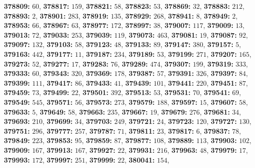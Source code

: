 \textsf{\bfseries 378809:} $60$, \textsf{\bfseries 378817:} $159$, \textsf{\bfseries 378821:} $58$, \textsf{\bfseries 378823:} $53$, \textsf{\bfseries 378869:} $32$, \textsf{\bfseries 378883:} $212$, \textsf{\bfseries 378893:} $2$, \textsf{\bfseries 378901:} $283$, \textsf{\bfseries 378919:} $135$, \textsf{\bfseries 378929:} $268$, \textsf{\bfseries 378941:} $8$, \textsf{\bfseries 378949:} $2$, \textsf{\bfseries 378953:} $66$, \textsf{\bfseries 378967:} $63$, \textsf{\bfseries 378977:} $172$, \textsf{\bfseries 378997:} $38$, \textsf{\bfseries 379007:} $117$, \textsf{\bfseries 379009:} $13$, \textsf{\bfseries 379013:} $72$, \textsf{\bfseries 379033:} $253$, \textsf{\bfseries 379039:} $119$, \textsf{\bfseries 379073:} $463$, \textsf{\bfseries 379081:} $19$, \textsf{\bfseries 379087:} $92$, \textsf{\bfseries 379097:} $132$, \textsf{\bfseries 379103:} $58$, \textsf{\bfseries 379123:} $48$, \textsf{\bfseries 379133:} $89$, \textsf{\bfseries 379147:} $380$, \textsf{\bfseries 379157:} $5$, \textsf{\bfseries 379163:} $442$, \textsf{\bfseries 379177:} $11$, \textsf{\bfseries 379187:} $234$, \textsf{\bfseries 379189:} $53$, \textsf{\bfseries 379199:} $271$, \textsf{\bfseries 379207:} $165$, \textsf{\bfseries 379273:} $52$, \textsf{\bfseries 379277:} $17$, \textsf{\bfseries 379283:} $76$, \textsf{\bfseries 379289:} $474$, \textsf{\bfseries 379307:} $199$, \textsf{\bfseries 379319:} $333$, \textsf{\bfseries 379333:} $60$, \textsf{\bfseries 379343:} $320$, \textsf{\bfseries 379369:} $178$, \textsf{\bfseries 379387:} $57$, \textsf{\bfseries 379391:} $326$, \textsf{\bfseries 379397:} $84$, \textsf{\bfseries 379399:} $111$, \textsf{\bfseries 379417:} $86$, \textsf{\bfseries 379433:} $41$, \textsf{\bfseries 379439:} $101$, \textsf{\bfseries 379441:} $220$, \textsf{\bfseries 379451:} $87$, \textsf{\bfseries 379459:} $73$, \textsf{\bfseries 379499:} $22$, \textsf{\bfseries 379501:} $392$, \textsf{\bfseries 379513:} $53$, \textsf{\bfseries 379531:} $70$, \textsf{\bfseries 379541:} $69$, \textsf{\bfseries 379549:} $545$, \textsf{\bfseries 379571:} $56$, \textsf{\bfseries 379573:} $273$, \textsf{\bfseries 379579:} $188$, \textsf{\bfseries 379597:} $15$, \textsf{\bfseries 379607:} $58$, \textsf{\bfseries 379633:} $5$, \textsf{\bfseries 379649:} $58$, \textsf{\bfseries 379663:} $235$, \textsf{\bfseries 379667:} $19$, \textsf{\bfseries 379679:} $276$, \textsf{\bfseries 379681:} $34$, \textsf{\bfseries 379693:} $210$, \textsf{\bfseries 379699:} $34$, \textsf{\bfseries 379703:} $249$, \textsf{\bfseries 379721:} $24$, \textsf{\bfseries 379723:} $120$, \textsf{\bfseries 379727:} $130$, \textsf{\bfseries 379751:} $296$, \textsf{\bfseries 379777:} $257$, \textsf{\bfseries 379787:} $71$, \textsf{\bfseries 379811:} $23$, \textsf{\bfseries 379817:} $6$, \textsf{\bfseries 379837:} $78$, \textsf{\bfseries 379849:} $223$, \textsf{\bfseries 379853:} $95$, \textsf{\bfseries 379859:} $87$, \textsf{\bfseries 379877:} $108$, \textsf{\bfseries 379889:} $113$, \textsf{\bfseries 379903:} $102$, \textsf{\bfseries 379909:} $167$, \textsf{\bfseries 379913:} $167$, \textsf{\bfseries 379927:} $22$, \textsf{\bfseries 379931:} $216$, \textsf{\bfseries 379963:} $48$, \textsf{\bfseries 379979:} $17$, \textsf{\bfseries 379993:} $172$, \textsf{\bfseries 379997:} $251$, \textsf{\bfseries 379999:} $22$, \textsf{\bfseries 380041:} $154$, 
